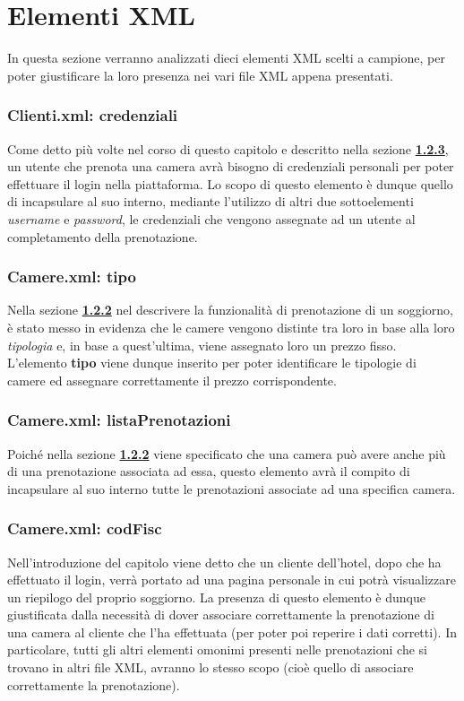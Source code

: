 \documentclass [a4paper, 12pt]{book}
\begin{document}
\medskip

\section{Elementi XML}
In questa sezione verranno analizzati dieci elementi XML scelti a campione, per poter giustificare la loro presenza nei vari file XML appena presentati.

\subsubsection{Clienti.xml: credenziali}
Come detto più volte nel corso di questo capitolo e descritto nella sezione \hyperref[Login]{\textbf{1.2.3}}, un utente che prenota una camera avrà bisogno di credenziali personali per poter effettuare il login nella piattaforma. Lo scopo di questo elemento è dunque quello di incapsulare al suo interno, mediante l'utilizzo di altri due sottoelementi \textit{username} e \textit{password}, le credenziali che vengono assegnate ad un utente al completamento della prenotazione.

\subsubsection{Camere.xml: tipo}
Nella sezione \hyperref[PrenotazioneCamera]{\textbf{1.2.2}} nel descrivere la funzionalità di prenotazione di un soggiorno, è stato messo in evidenza che le camere vengono distinte tra loro in base alla loro \textit{tipologia} e, in base a quest'ultima, viene assegnato loro un prezzo fisso. L'elemento \textbf{tipo} viene dunque inserito per poter identificare le tipologie di camere ed assegnare correttamente il prezzo corrispondente.

\subsubsection{Camere.xml: listaPrenotazioni}
Poiché nella sezione \hyperref[PrenotazioneCamera]{\textbf{1.2.2}} viene specificato che una camera può avere anche più di una prenotazione associata ad essa, questo elemento avrà il compito di incapsulare al suo interno tutte le prenotazioni associate ad una specifica camera.

\subsubsection{Camere.xml: codFisc}
Nell'introduzione del capitolo viene detto che un cliente dell'hotel, dopo che ha effettuato il login, verrà portato ad una pagina personale in cui potrà visualizzare un riepilogo del proprio soggiorno. La presenza di questo elemento è dunque giustificata dalla necessità di dover associare correttamente la prenotazione di una camera al cliente che l'ha effettuata (per poter poi reperire i dati corretti). In particolare, tutti gli altri elementi omonimi presenti nelle prenotazioni che si trovano in altri file XML, avranno lo stesso scopo (cioè quello di associare correttamente la prenotazione).
\end{document}
